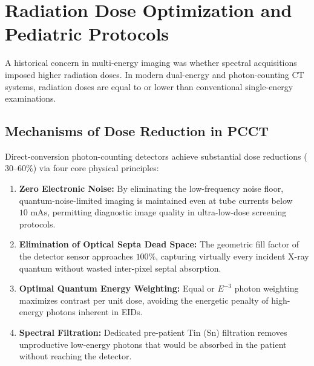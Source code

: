 \documentclass[11pt,a4paper]{article}
\begin{document}
\section{Radiation Dose Optimization and Pediatric Protocols}

A historical concern in multi-energy imaging was whether spectral acquisitions imposed higher radiation doses. In modern dual-energy and photon-counting CT systems, radiation doses are equal to or lower than conventional single-energy examinations.

\subsection{Mechanisms of Dose Reduction in PCCT}
Direct-conversion photon-counting detectors achieve substantial dose reductions ($30\text{--}60\%$) via four core physical principles:
\begin{enumerate}
    \item \textbf{Zero Electronic Noise:} By eliminating the low-frequency noise floor, quantum-noise-limited imaging is maintained even at tube currents below $10\text{ mAs}$, permitting diagnostic image quality in ultra-low-dose screening protocols.
    \item \textbf{Elimination of Optical Septa Dead Space:} The geometric fill factor of the detector sensor approaches $100\%$, capturing virtually every incident X-ray quantum without wasted inter-pixel septal absorption.
    \item \textbf{Optimal Quantum Energy Weighting:} Equal or $E^{-3}$ photon weighting maximizes contrast per unit dose, avoiding the energetic penalty of high-energy photons inherent in EIDs.
    \item \textbf{Spectral Filtration:} Dedicated pre-patient Tin (Sn) filtration removes unproductive low-energy photons that would be absorbed in the patient without reaching the detector.
\end{enumerate}
\end{document}
